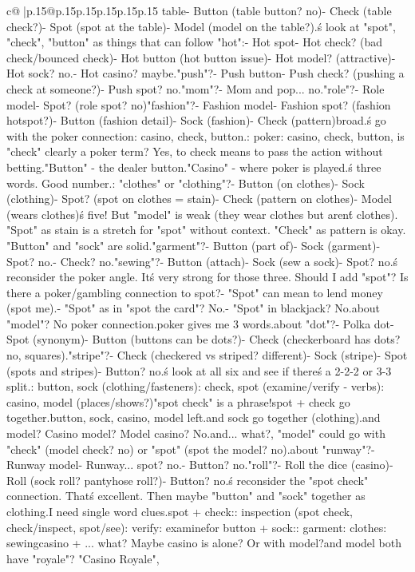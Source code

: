 \documentclass{article}
\begin{document}
{\begin{supertabular}{c@{$\;$}|p{.15\linewidth}@{}p{.15\linewidth}p{.15\linewidth}p{.15\linewidth}p{.15\linewidth}p{.15\linewidth}}
{{{table\n- Button (table button? no)\n- Check (table check?)\n- Spot (spot at the table)\n- Model (model on the table?)\nWeak.\n\nLet\'s look at "spot", "check", "button" as things that can follow "hot":\n- Hot spot\n- Hot check? (bad check/bounced check)\n- Hot button (hot button issue)\n- Hot model? (attractive)\n- Hot sock? no.\n- Hot casino? maybe.\n\nOr "push"?\n- Push button\n- Push check? (pushing a check at someone?)\n- Push spot? no.\n\n"mom"?\n- Mom and pop... no.\n\n"role"?\n- Role model\n- Spot? (role spot? no)\n\n"fashion"?\n- Fashion model\n- Fashion spot? (fashion hotspot?)\n- Button (fashion detail)\n- Sock (fashion)\n- Check (pattern)\nToo broad.\n\nLet\'s go with the poker connection: casino, check, button.\n\nCLUE: poker\nTARGETS: casino, check, button\n\nWait, is "check" clearly a poker term? Yes, to check means to pass the action without betting.\n"Button" - the dealer button.\n"Casino" - where poker is played.\n\nThat\'s three words. Good number.\n\nAlternative: "clothes" or "clothing"?\n- Button (on clothes)\n- Sock (clothing)\n- Spot? (spot on clothes = stain)\n- Check (pattern on clothes)\n- Model (wears clothes)\nThat\'s five! But "model" is weak (they wear clothes but aren\'t clothes). "Spot" as stain is a stretch for "spot" without context. "Check" as pattern is okay. "Button" and "sock" are solid.\n\nBut "garment"?\n- Button (part of)\n- Sock (garment)\n- Spot? no.\n- Check? no.\n\n"sewing"?\n- Button (attach)\n- Sock (sew a sock)\n- Spot? no.\n\nLet\'s reconsider the poker angle. It\'s very strong for those three. Should I add "spot"? Is there a poker/gambling connection to spot?\n- "Spot" can mean to lend money (spot me).\n- "Spot" as in "spot the card"? No.\n- "Spot" in blackjack? No.\n\nWhat about "model"? No poker connection.\n\nSo poker gives me 3 words.\n\nWhat about "dot"?\n- Polka dot\n- Spot (synonym)\n- Button (buttons can be dots?)\n- Check (checkerboard has dots? no, squares)\nWeak.\n\n"stripe"?\n- Check (checkered vs striped? different)\n- Sock (stripe)\n- Spot (spots and stripes)\n- Button? no.\n\nLet\'s look at all six and see if there\'s a 2-2-2 or 3-3 split.\n{}: button, sock (clothing/fasteners): check, spot (examine/verify - verbs): casino, model (places/shows?)\n\n"spot check" is a phrase!\nSo spot + check go together.\n\nThen button, sock, casino, model left.\n\nButton and sock go together (clothing).\n\nCasino and model? Casino model? Model casino? No.\n\nCasino and... what?\n\nWait, "model" could go with "check" (model check? no) or "spot" (spot the model? no).\n\nWhat about "runway"?\n- Runway model\n- Runway... spot? no.\n- Button? no.\n\n"roll"?\n- Roll the dice (casino)\n- Roll (sock roll? pantyhose roll?)\n- Button? no.\n\nLet\'s reconsider the "spot check" connection. That\'s excellent. Then maybe "button" and "sock" together as clothing.\n\nBut I need single word clues.\n\nFor spot + check:\nCLUE: inspection (spot check, check/inspect, spot/see)\nCLUE: verify\nCLUE: examine\n\nThen for button + sock:\nCLUE: garment\nCLUE: clothes\nCLUE: sewing\n\nFor casino + ... what? Maybe casino is alone? Or with model?\nCasino and model both have "royale"? "Casino Royale", }}}
\end{supertabular}}
\end{document}
